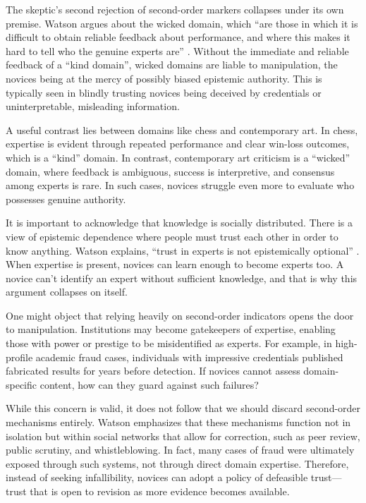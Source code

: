 \documentclass[12pt, a4paper, twoside]{article}
\begin{document}
The skeptic’s second rejection of second-order markers collapses under its own premise. Watson argues about the wicked domain, which “are those in which it is difficult to obtain reliable feedback about performance, and where this makes it hard to tell who the genuine experts are” \autocite[p.\ 210]{watson2022fixing}. Without the immediate and reliable feedback of a “kind domain”, wicked domains are liable to manipulation, the novices being at the mercy of possibly biased epistemic authority. This is typically seen in blindly trusting novices being deceived by credentials or uninterpretable, misleading information.

A useful contrast lies between domains like chess and contemporary art. In chess, expertise is evident through repeated performance and clear win-loss outcomes, which is a “kind” domain. In contrast, contemporary art criticism is a “wicked” domain, where feedback is ambiguous, success is interpretive, and consensus among experts is rare. In such cases, novices struggle even more to evaluate who possesses genuine authority.

It is important to acknowledge that knowledge is socially distributed. There is a view of epistemic dependence where people must trust each other in order to know anything. Watson explains, “trust in experts is not epistemically optional” \autocite[p.\ 139]{watson2022fixing}. When expertise is present, novices can learn enough to become experts too. A novice can't identify an expert without sufficient knowledge, and that is why this argument collapses on itself.

One might object that relying heavily on second-order indicators opens the door to manipulation. Institutions may become gatekeepers of expertise, enabling those with power or prestige to be misidentified as experts. For example, in high-profile academic fraud cases, individuals with impressive credentials published fabricated results for years before detection. If novices cannot assess domain-specific content, how can they guard against such failures?

While this concern is valid, it does not follow that we should discard second-order mechanisms entirely. Watson emphasizes that these mechanisms function not in isolation but within social networks that allow for correction, such as peer review, public scrutiny, and whistleblowing. In fact, many cases of fraud were ultimately exposed through such systems, not through direct domain expertise. Therefore, instead of seeking infallibility, novices can adopt a policy of defeasible trust—trust that is open to revision as more evidence becomes available.
\end{document}
